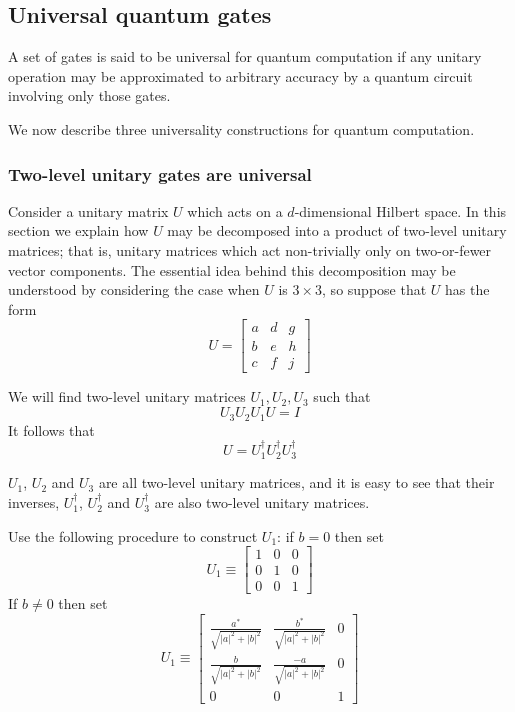 \subsection{Universal quantum gates}

A set of gates is said to be universal for quantum computation if any unitary operation may be approximated to arbitrary accuracy by a quantum circuit involving only those gates.
\vspace{1em}

We now describe three universality constructions for quantum computation.

\subsubsection{Two-level unitary gates are universal}

Consider a unitary matrix $U$ which acts on a $d$-dimensional Hilbert space. In this section we explain how $U$ may be decomposed into a product of two-level unitary matrices; that is, unitary matrices which act non-trivially only on two-or-fewer vector components. The essential idea behind this decomposition may be understood by considering the case when $U$ is $3\times 3$, so suppose that $U$ has the form
$$U = \begin{bmatrix}
a&d&g\\
b&e&h\\
c&f&j
\end{bmatrix}$$

We will find two-level unitary matrices $U_1, U_2, U_3$ such that
$$U_3U_2U_1U = I$$
It follows that
$$U = U_1^\dag U_2^\dag U_3^\dag$$

$U_1$, $U_2$ and $U_3$ are all two-level unitary matrices, and it is easy to see that their inverses, $U_1^\dag$, $U_2^\dag$ and $U_3^\dag$ are also two-level unitary matrices.
\vspace{1em}

Use the following procedure to construct $U_1$: if $b = 0$ then set
$$U_1 \equiv \begin{bmatrix}1&0&0\\0&1&0\\0&0&1\end{bmatrix}$$
If $b \neq 0$ then set
$$U_1 \equiv \begin{bmatrix}
\frac{a^\ast}{\sqrt{|a|^2+|b|^2}} & \frac{b^\ast}{\sqrt{|a|^2+|b|^2}} &0\\
\frac{b}{\sqrt{|a|^2+|b|^2}} & \frac{-a}{\sqrt{|a|^2+|b|^2}} &0\\
0&0&1
\end{bmatrix}$$

